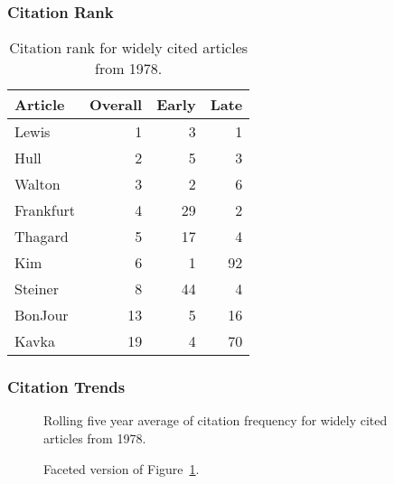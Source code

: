 \documentclass[
  10pt,
  letterpaper,
  DIV=11,
  numbers=noendperiod,
  twoside]{scrartcl}
\begin{document}
\subsubsection*{Citation Rank}\label{sec-rank-1978}

\begin{longtable}[]{@{}lrrr@{}}

\caption{\label{tbl-citation-rank-1978}Citation rank for widely cited
articles from 1978.}

\tabularnewline

\toprule\noalign{}
Article & Overall & Early & Late \\
\midrule\noalign{}
\endhead
\bottomrule\noalign{}
\endlastfoot
Lewis & 1 & 3 & 1 \\
Hull & 2 & 5 & 3 \\
Walton & 3 & 2 & 6 \\
Frankfurt & 4 & 29 & 2 \\
Thagard & 5 & 17 & 4 \\
Kim & 6 & 1 & 92 \\
Steiner & 8 & 44 & 4 \\
BonJour & 13 & 5 & 16 \\
Kavka & 19 & 4 & 70 \\

\end{longtable}

\subsubsection*{Citation Trends}\label{sec-trends-1978}

\begin{figure}


\caption{\label{fig-citation-spaghetti-1978}Rolling five year average of
citation frequency for widely cited articles from 1978.}

\end{figure}%

\begin{figure}


\caption{\label{fig-citation-facet-1978}Faceted version of
Figure~\ref{fig-citation-spaghetti-1978}.}

\end{figure}%
\end{document}
